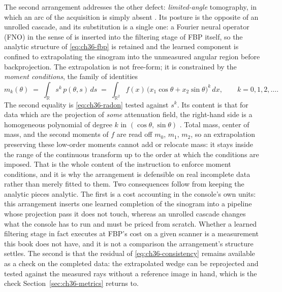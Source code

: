 The second arrangement addresses the other defect: \emph{limited-angle}
tomography, in which an arc of the acquisition is simply absent
. Its posture is the opposite of an unrolled
cascade, and its substitution is a single one: a Fourier
neural operator (FNO) in
the sense of \cite{li2021fourier} is inserted into the filtering stage of FBP
itself, so the
analytic structure of \eqref{eq:ch36-fbp} is retained and the learned component
is confined to extrapolating the sinogram into the unmeasured angular region
before backprojection. The extrapolation is not free-form; it is constrained by
the \emph{moment conditions}, the family of identities
\begin{equation}
  \label{eq:ch36-moment}
  m_k(\theta) \;=\; \int_{\mathbb{R}} s^{k}\, p(\theta,s)\, ds \;=\; \int_{\mathbb{R}^2} f(x)\,\big(x_1\cos\theta + x_2\sin\theta\big)^{k}\, dx, \qquad k = 0,1,2,\ldots.
\end{equation}
The second equality is \eqref{eq:ch36-radon} tested against $s^k$. Its content is
that for data which are the projection of \emph{some} attenuation field, the
right-hand side is a homogeneous polynomial of degree $k$ in
$(\cos\theta,\sin\theta)$
. Total mass,
center of mass, and the second moments of $f$ are read off $m_0$, $m_1$, $m_2$,
so an extrapolation preserving these low-order moments cannot add or relocate
mass: it stays inside the range of the continuous transform up to the order at
which the conditions are imposed. That is the whole content of the instruction
to enforce moment conditions, and it is why the arrangement is defensible on real
incomplete data rather than merely fitted to them. Two consequences follow from
keeping the analytic pieces analytic. The first is a cost accounting in the
console's own units: this arrangement inserts one learned completion of the
sinogram into a pipeline whose projection pass it does not touch, whereas an
unrolled cascade changes what the console has to run and must be priced from
scratch. Whether a learned filtering stage in fact executes at FBP's cost on a
given scanner is a measurement this book does not have, and it is not a
comparison the arrangement's structure settles. The second is that the residual
of \eqref{eq:ch36-consistency} remains available as a check on the completed
data: the extrapolated wedge can be reprojected and tested against the measured
rays without a reference image in hand, which is the check
Section~\ref{sec:ch36-metrics} returns to.


